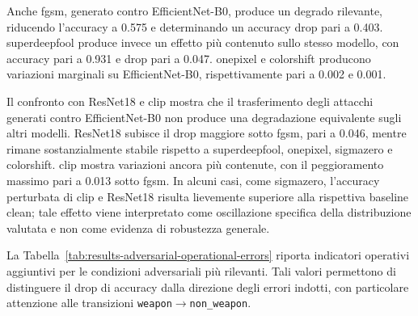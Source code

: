 Anche \gls{fgsm}, generato contro EfficientNet-B0, produce un degrado rilevante,
riducendo l'accuracy a 0.575 e determinando un accuracy drop pari a 0.403.
\gls{superdeepfool} produce invece un effetto più contenuto sullo stesso modello,
con accuracy pari a 0.931 e drop pari a 0.047. \gls{onepixel} e \gls{colorshift}
producono variazioni marginali su EfficientNet-B0, rispettivamente pari a 0.002 e
0.001.

Il confronto con ResNet18 e \gls{clip} mostra che il trasferimento degli attacchi
generati contro EfficientNet-B0 non produce una degradazione equivalente sugli
altri modelli. ResNet18 subisce il drop maggiore sotto \gls{fgsm}, pari a 0.046,
mentre rimane sostanzialmente stabile rispetto a \gls{superdeepfool},
\gls{onepixel}, \gls{sigmazero} e \gls{colorshift}. \gls{clip} mostra variazioni
ancora più contenute, con il peggioramento massimo pari a 0.013 sotto
\gls{fgsm}. In alcuni casi, come \gls{sigmazero}, l'accuracy perturbata di
\gls{clip} e ResNet18 risulta lievemente superiore alla rispettiva baseline
clean; tale effetto viene interpretato come oscillazione specifica della
distribuzione valutata e non come evidenza di robustezza generale.

La Tabella~\ref{tab:results-adversarial-operational-errors} riporta indicatori
operativi aggiuntivi per le condizioni adversariali più rilevanti. Tali valori
permettono di distinguere il drop di accuracy dalla direzione degli errori
indotti, con particolare attenzione alle transizioni
\texttt{weapon}\(\rightarrow\)\texttt{non\_weapon}.

